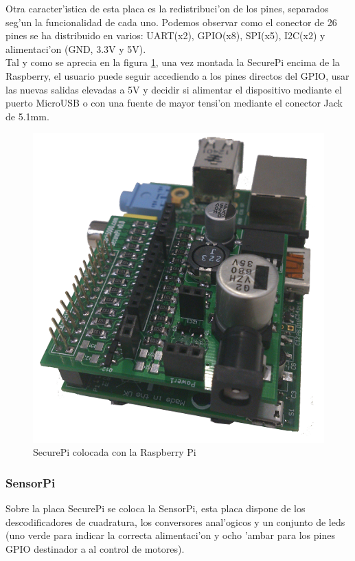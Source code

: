 \documentclass[twoside,12pt]{article}
\begin{document}
Otra caracter'istica de esta placa es la redistribuci'on de los pines, separados seg'un la funcionalidad de cada uno. Podemos observar como el conector de 26 pines se ha distribuido en varios: UART(x2), GPIO(x8), SPI(x5), I2C(x2) y alimentaci'on (GND, 3.3V y 5V).\\

Tal y como se aprecia en la figura \ref{fig:SecurePi_mounted}, una vez montada la SecurePi encima de la Raspberry, el usuario puede seguir accediendo a los pines directos del GPIO, usar las nuevas salidas elevadas a 5V y decidir si alimentar el dispositivo mediante el puerto MicroUSB o con una fuente de mayor tensi'on mediante el conector Jack de 5.1mm.

\begin{figure}[ht]
\centering
\includegraphics[scale=0.40]{images/SecurePi_mounted.png}
\caption{SecurePi colocada con la Raspberry Pi}
\label{fig:SecurePi_mounted}
\end{figure} 

\subsubsection{SensorPi}
Sobre la placa SecurePi se coloca la SensorPi, esta placa dispone de los descodificadores de cuadratura, los conversores anal'ogicos y un conjunto de leds (uno verde para indicar la correcta alimentaci'on y ocho 'ambar para los pines GPIO destinador a al control de motores).\\
\end{document}
